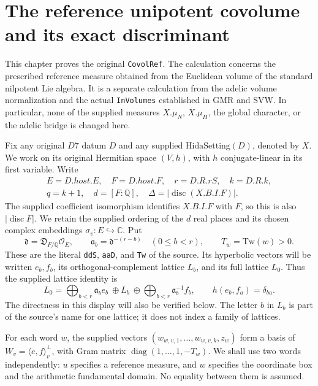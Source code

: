 \section{The reference unipotent covolume and its exact discriminant}
\label{sec:reference-covolume-v56}

This chapter proves the original \texttt{CovolRef}.  The calculation concerns
the prescribed reference measure obtained from the Euclidean volume of the
standard nilpotent Lie algebra.  It is a separate calculation from the
adelic volume normalization and the actual \texttt{InVolumes} established
in GMR and SVW.  In particular, none of the supplied measures
\(X.\mu_N\), \(X.\mu_H\), the global character, or the adelic bridge is
changed here.

Fix any original \(D7\) datum \(D\) and any supplied
\(\mathrm{HidaSetting}(D)\), denoted by \(X\).  We work on its original
Hermitian space \((V,h)\), with \(h\) conjugate-linear in its first
variable.  Write
\[
 \begin{gathered}
 E=D.host.E,\quad F=D.host.F,\quad r=D.R.rS,\quad k=D.R.k,\\
 q=k+1,\quad d=[F:\mathbb Q],\quad
 \Delta=|\operatorname{disc}(X.B.I.F)|.
 \end{gathered}
\]
The supplied coefficient isomorphism identifies \(X.B.I.F\) with \(F\),
so this is also \(|\operatorname{disc}F|\).  We retain the supplied
ordering of the \(d\) real places and its chosen complex embeddings
\(\sigma_v:E\hookrightarrow\mathbb C\).  Put
\[
 \mathfrak d=\mathfrak D_{F/\mathbb Q}\mathcal O_E,
 \qquad \mathfrak a_b=\mathfrak d^{-(r-b)}\quad(0\leq b<r),
 \qquad T_w=\mathrm{Tw}(w)>0.
\tag{RCV.1}
\]
These are the literal \texttt{ddS}, \texttt{aaD}, and \texttt{Tw} of the
source.  Its hyperbolic vectors will be written \(e_b,f_b\), its
orthogonal-complement lattice \(L_b\), and its full lattice \(L_0\).
Thus the supplied lattice identity is
\[
 L_0=\bigoplus_{b<r}\mathfrak a_b e_b\ \oplus L_b\ \oplus
       \bigoplus_{b<r}\mathfrak a_b^{-1}f_b,
 \qquad h(e_b,f_a)=\delta_{ba}.
\tag{RCV.2}
\]
The directness in this display will also be verified below.  The letter
\(b\) in \(L_b\) is part of the source's name for one lattice; it does
not index a family of lattices.

For each word \(w\), the supplied vectors
\((w_{w,v,1},\ldots,w_{w,v,k},z_w)\) form a basis of
\(W_v=\langle e,f\rangle^\perp_v\), with Gram matrix
\(\operatorname{diag}(1,\ldots,1,-T_w)\).  We shall use two words
independently: \(u\) specifies a reference measure, and \(w\) specifies
the coordinate box and the arithmetic fundamental domain.  No equality
between them is assumed.

